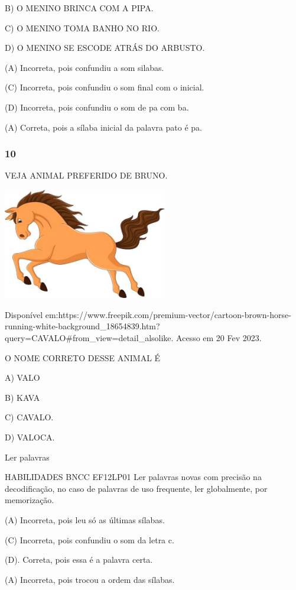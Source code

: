B) O MENINO BRINCA COM A PIPA.

C) O MENINO TOMA BANHO NO RIO.

D) O MENINO SE ESCODE ATRÁS DO ARBUSTO.

(A) Incorreta, pois confundiu a som silabas.

(C) Incorreta, pois confundiu o som final com o inicial.

(D) Incorreta, pois confundiu o som de pa com ba.

(A) Correta, pois a sílaba inicial da palavra pato é
pa.\protect\hypertarget{_heading=h.qmyrjsh4y5fg}{}{}

\subsubsection{10}\label{section-66}

VEJA ANIMAL PREFERIDO DE BRUNO.

\includegraphics[width=2.82210in,height=1.90975in]{media/image234.jpg}

Disponível
em:https://www.freepik.com/premium-vector/cartoon-brown-horse-running-white-background\_18654839.htm?query=CAVALO\#from\_view=detail\_alsolike.
Acesso em 20 Fev 2023.

O NOME CORRETO DESSE ANIMAL É

A) VALO

B) KAVA

C) CAVALO.

D) VALOCA.

Ler palavras

HABILIDADES BNCC EF12LP01 Ler palavras novas com precisão na
decodificação, no caso de palavras de uso frequente, ler globalmente,
por memorização.

(A) Incorreta, pois leu só as últimas sílabas.

(C) Incorreta, pois confundiu o som da letra c.

(D). Correta, pois essa é a palavra certa.

(A) Incorreta, pois trocou a ordem das
sílabas.\protect\hypertarget{_heading=h.oxa1c0ljwovb}{}{}

